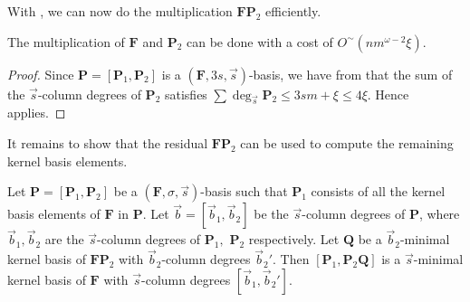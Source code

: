\begin{thm}
\begin{comment}
Next we multiply $\mathbf{A}$ with $\mathbf{B}^{(2)}$. We proceed
in the same way as before, but notice that $\mathbf{A}_{1}\mathbf{B}_{1}^{(2)}$
is no longer needed since $\mathbf{B}_{1}^{(2)}=0$. Multiplying $\mathbf{A}$
and $\mathbf{B}^{(2)}$ also costs $O^{\sim}\left(nm^{\omega-2}\xi\right)$.

Continue doing this, it costs $O^{\sim}\left(nm^{\omega-2}\xi\right)$.
to multiply $\mathbf{A}$ with the columns $\mathbf{B}^{(i)}$ for
$i$ from $1$ to $\log m$. As before, remember that $\mathbf{B}_{(j)}^{(i)}=0$
for $j>i$. The overall cost for $i$ from 1 to $\log m$ is $O^{\sim}\left(nm^{\omega-2}\xi\right)$
to multiply $\mathbf{A}$ and $\mathbf{B}$. \end{proof}
\end{comment}

\end{thm}
With , we can now do the
multiplication $\mathbf{F}\mathbf{P}_{2}$ efficiently. 
\begin{cor}
\label{cor:multiplyingFP2}The multiplication of $\mathbf{F}$ and
$\mathbf{P}_{2}$ can be done with a cost of $O^{\sim}\left(nm^{\omega-2}\xi\right)$.\end{cor}
\begin{proof}
Since $\mathbf{P}=[\mathbf{P}_{1},\mathbf{P}_{2}]$ is a $(\mathbf{F},3s,\vec{s})$-basis,
we have from 
that the sum of the $\vec{s}$-column degrees of $\mathbf{P}_{2}$
satisfies $\sum\deg_{\vec{s}}\mathbf{P}_{2}\le3sm+\xi\leq4\xi$. Hence
 applies. 
\end{proof}
It remains to show that the residual $\mathbf{F}\mathbf{P}_{2}$ can
be used to compute the remaining kernel basis elements. 
\begin{thm}
\label{thm:continueComputingNullspaceBasisByColumns}Let $\mathbf{P}=\left[\mathbf{P}_{1},\mathbf{P}_{2}\right]$
be a $\left(\mathbf{F},\sigma,\vec{s}\right)$-basis such that $\mathbf{P}_{1}$
consists of all the kernel basis elements of $\mathbf{F}$ in $\mathbf{P}$.
Let $\vec{b}=[\vec{b}_{1},\vec{b}_{2}]$ be the $\vec{s}$-column
degrees of $\mathbf{P}$, where $\vec{b}_{1},\vec{b}_{2}$ are the
$\vec{s}$-column degrees of $\mathbf{P}_{1},$ $\mathbf{P}_{2}$
respectively. Let $\mathbf{Q}$ be a $\vec{b}_{2}$-minimal kernel
basis of $\mathbf{F}\mathbf{P}_{2}$ with $\vec{b}_{2}$-column degrees
$\vec{b}_{2}'$. Then $\left[\mathbf{P}_{1},\mathbf{P}_{2}\mathbf{Q}\right]$
is a $\vec{s}$-minimal kernel basis of $\mathbf{F}$ with $\vec{s}$-column
degrees $[\vec{b}_{1},\vec{b}_{2}']$.\end{thm}
